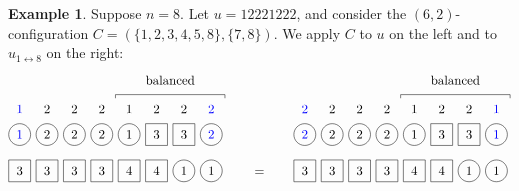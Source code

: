 \documentclass[submission]{FPSAC2018}
\theoremstyle{plain}
\theoremstyle{definition}
\newtheorem{example}[thm]{Example}
\numberwithin{equation}{section}
\begin{document}
\begin{example}
Suppose $n = 8$.
Let $u = 12221222$, and consider the $(6,2)$-configuration $C = (\{1,2,3,4,5,8\}, \{7,8\})$.
We apply $C$ to $u$ on the left and to $u_{1 \leftrightarrow 8}$ on the right:
\[
\begin{tikzpicture}[baseline=25]
  \def\sc{0.75}   %
  \def\lll{2.7}   %
  \def\ll{2}   %
  \def\l{1}   %
  \node[color=blue] at (1*\sc,\lll) {$1$};
  \node[color=blue] at (8*\sc,\lll) {$2$};
  \foreach \i in {5} { \node at (\i*\sc,\lll){$1$}; }
  \foreach \i in {2,3,4,6,7} { \node at (\i*\sc,\lll){$2$}; }
  \foreach \i in {1,2,3,4,5,8} { \draw (\i*\sc,\ll) circle (0.3); }
  \foreach \i in {6,7} { \draw (\i*\sc-.3,\ll-.3) rectangle +(0.6,+0.6); }
  \node[color=blue] at (1*\sc,\ll) {$1$};
  \node[color=blue] at (8*\sc,\ll) {$2$};
  \foreach \i in {5} { \node at (\i*\sc,\ll) {$1$}; }
  \foreach \i in {2,3,4} { \node at (\i*\sc,\ll) {$2$}; }
  \foreach \i in {6,7} { \node at (\i*\sc,\ll) {$3$}; }
  \foreach \i in {7,8} { \draw (\i*\sc,\l) circle (0.3); }
  \foreach \i in {1,2,3,4,5,6} { \draw (\i*\sc-.3,\l-.3) rectangle +(0.6,+0.6); }
  \foreach \i in {5,6} { \node at (\i*\sc,\l) {$4$}; }
  \foreach \i in {7,8} { \node at (\i*\sc,\l) {$1$}; }
  \foreach \i in {1,2,3,4} { \node at (\i*\sc,\l) {$3$}; }
  \draw (4.5*\sc,3) -- (4.5*\sc,3.1) -- (8.5*\sc,3.1) -- (8.5*\sc,3);
  \node at (6.5*\sc,3.5) {balanced};
\end{tikzpicture}
\hspace{20pt} = \hspace{20pt}
\begin{tikzpicture}[baseline=25]
  \def\sc{0.75}   %
  \def\lll{2.7}   %
  \def\ll{2}   %
  \def\l{1}   %
  \node[color=blue] at (8*\sc,\lll) {$1$};
  \node[color=blue] at (1*\sc,\lll) {$2$};
  \foreach \i in {5} { \node at (\i*\sc,\lll){$1$}; }
  \foreach \i in {2,3,4,6,7} { \node at (\i*\sc,\lll){$2$}; }
  \foreach \i in {1,2,3,4,5,8} { \draw (\i*\sc,\ll) circle (0.3); }
  \foreach \i in {6,7} { \draw (\i*\sc-.3,\ll-.3) rectangle +(0.6,+0.6); }
  \node[color=blue] at (8*\sc,\ll) {$1$};
  \node[color=blue] at (1*\sc,\ll) {$2$};
  \foreach \i in {5} { \node at (\i*\sc,\ll) {$1$}; }
  \foreach \i in {2,3,4} { \node at (\i*\sc,\ll) {$2$}; }
  \foreach \i in {6,7} { \node at (\i*\sc,\ll) {$3$}; }
  \foreach \i in {7,8} { \draw (\i*\sc,\l) circle (0.3); }
  \foreach \i in {1,2,3,4,5,6} { \draw (\i*\sc-.3,\l-.3) rectangle +(0.6,+0.6); }
  \foreach \i in {5,6} { \node at (\i*\sc,\l) {$4$}; }
  \foreach \i in {7,8} { \node at (\i*\sc,\l) {$1$}; }
  \foreach \i in {1,2,3,4} { \node at (\i*\sc,\l) {$3$}; }
  \draw (4.5*\sc,3) -- (4.5*\sc,3.1) -- (8.5*\sc,3.1) -- (8.5*\sc,3);
  \node at (6.5*\sc,3.5) {balanced};
\end{tikzpicture}
\]
\end{example}
\end{document}

